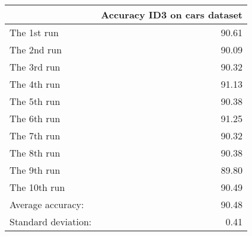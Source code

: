 \begin{tabular}{lr}
\toprule
{} &  Accuracy ID3 on cars dataset \\
\midrule
The 1st run         &                         90.61 \\
The 2nd run         &                         90.09 \\
The 3rd run         &                         90.32 \\
The 4th run         &                         91.13 \\
The 5th run         &                         90.38 \\
The 6th run         &                         91.25 \\
The 7th run         &                         90.32 \\
The 8th run         &                         90.38 \\
The 9th run         &                         89.80 \\
The 10th run        &                         90.49 \\
Average accuracy:   &                         90.48 \\
Standard deviation: &                          0.41 \\
\bottomrule
\end{tabular}
